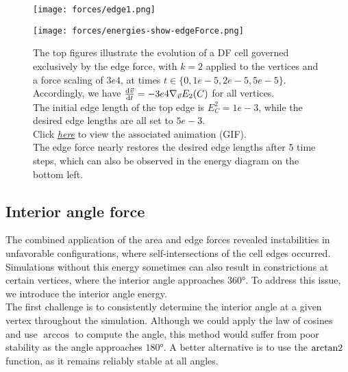 \begin{figure}[htbp]
  \centering
  \texttt{[image: forces/edge1.png]}\\[1ex]
  \begin{minipage}[c]{0.35\textwidth}
    \texttt{[image: forces/energies-show-edgeForce.png]}
  \end{minipage}\hfill
  \begin{minipage}[c]{0.6\textwidth}
    \caption{
		The top figures illustrate the evolution of a DF cell governed exclusively by the edge force, with $k=2$ applied to the vertices and a force scaling of $3e4$, at times $t \in \{0, 1e-5, 2e-5, 5e-5\}$.\\
		Accordingly, we have $\frac{\mathrm{d} \vec{v}}{\mathrm{d} t} = - 3e4 \nabla_{\vec{v}} E_2(C)$ for all vertices.\\
		The initial edge length of the top edge is $E_C^2 = 1e-3$, while the desired edge lengths are all set to $5e-3$.\\
		Click \href{https://github.com/tivo476c/FlexibleCellModel/blob/master/figures/gifs/showForces/show-edgeForce.gif}{\textit{here}} to view the associated animation (GIF).\\
		The edge force nearly restores the desired edge lengths after 5 time steps, which can also be observed in the energy diagram on the bottom left.
    } 
	\label{fig:edgeForce}
  \end{minipage}
\end{figure}

\subsection{Interior angle force}
The combined application of the area and edge forces revealed instabilities in unfavorable configurations, where self-intersections of the cell edges occurred. 
Simulations without this energy sometimes can also result in constrictions at certain vertices, where the interior angle approaches $360$°. 
To address this issue, we introduce the interior angle energy. \\
The first challenge is to consistently determine the interior angle at a given vertex throughout the simulation.
Although we could apply the law of cosines and use $\arccos$ to compute the angle, this method would suffer from poor stability as the angle approaches $180$°.
A better alternative is to use the $\operatorname{arctan2}$ function, as it remains reliably stable at all angles. \\

